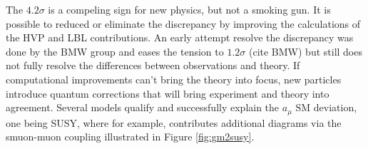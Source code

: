 
The $4.2\sigma$  is a compeling sign for new physics, but not a smoking gun. It is possible to reduced or eliminate the discrepancy by improving the calculations of the HVP and LBL contributions. An early attempt resolve the discrepancy was done by the BMW group and eases the tension  to $1.2\sigma$ (cite BMW) but still does not fully resolve the differences between observations and theory. If computational improvements can't bring the theory into focus, new particles introduce  quantum corrections that will bring experiment and theory into agreement. Several models qualify and successfully explain the $a_\mu$ SM deviation, one being SUSY, where for example, contributes additional diagrams via the smuon-muon coupling illustrated in Figure \ref{fig:gm2susy}.

